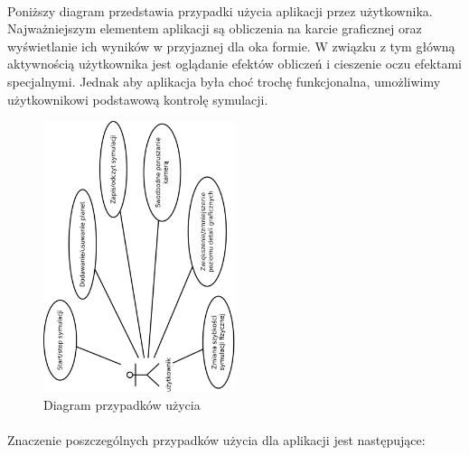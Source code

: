 \paragraph{}

Poniższy diagram przedstawia przypadki użycia aplikacji przez użytkownika. Najważniejszym elementem aplikacji są obliczenia na karcie graficznej oraz wyświetlanie ich wyników w przyjaznej dla oka formie. W związku z tym główną aktywnością użytkownika jest oglądanie efektów obliczeń i cieszenie oczu efektami specjalnymi. Jednak aby aplikacja była choć trochę funkcjonalna, umożliwimy użytkownikowi podstawową kontrolę symulacji.

\begin{figure}[h]
	\centering
	\includegraphics[width=0.5\textwidth,angle=-90]{use-case.pdf}
	\caption{Diagram przypadków użycia}
	\label{fig:use-case}
\end{figure}

\paragraph{}

Znaczenie poszczególnych przypadków użycia dla aplikacji jest następujące:

